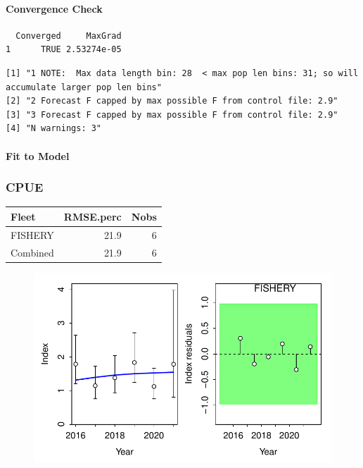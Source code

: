 \documentclass[
  letterpaper,
  DIV=11,
  numbers=noendperiod]{scrartcl}
\let\oldparagraph\paragraph
\renewcommand{\paragraph}[1]{\oldparagraph{#1}\mbox{}}
\begin{document}
\hypertarget{convergence-check}{%
\paragraph{Convergence Check}\label{convergence-check}}

\begin{verbatim}
  Converged     MaxGrad
1      TRUE 2.53274e-05
\end{verbatim}

\begin{verbatim}
[1] "1 NOTE:  Max data length bin: 28  < max pop len bins: 31; so will accumulate larger pop len bins"
[2] "2 Forecast F capped by max possible F from control file: 2.9"                                    
[3] "3 Forecast F capped by max possible F from control file: 2.9"                                    
[4] "N warnings: 3"                                                                                   
\end{verbatim}

\hypertarget{fit-to-model}{%
\paragraph{Fit to Model}\label{fit-to-model}}

\hypertarget{cpue}{%
\subsubsection{CPUE}\label{cpue}}

\begin{longtable}{lrr}
\toprule
Fleet & RMSE.perc & Nobs \\ 
\midrule
FISHERY & 21.9 & 6 \\ 
Combined & 21.9 & 6 \\ 
\bottomrule
\end{longtable}

\begin{figure}

{\centering \includegraphics{LUKA_50_Base_model_diags_report_files/figure-pdf/indexfits-1.pdf}

}

\end{figure}
\end{document}
